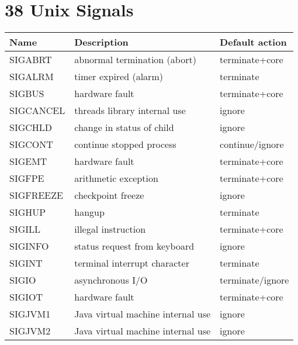 \documentclass{article}
\begin{document}
\section{38 Unix Signals}
\begin{table}[h!]
\begin{center}
    \begin{tabular}[h!]{|l | l | l|}
        \hline
        Name        & Description 	                       & Default action        \\
        \hline
        \hline
        SIGABRT     & abnormal termination (abort)         & terminate+core        \\
        SIGALRM     & timer expired (alarm) 	           & terminate             \\
        SIGBUS 	    & hardware fault 		               & terminate+core        \\
        SIGCANCEL 	& threads library internal use 	       & ignore                \\
        SIGCHLD 	& change in status of child 	       & ignore                \\
        SIGCONT 	& continue stopped process 		       & continue/ignore       \\
        SIGEMT 	    & hardware fault 			           & terminate+core        \\
        SIGFPE 	    & arithmetic exception 	               & terminate+core        \\
        SIGFREEZE   & checkpoint freeze 			       & ignore                \\
        SIGHUP 	    & hangup                               & terminate             \\
        SIGILL 	    & illegal instruction 	               & terminate+core        \\
        SIGINFO 	& status request from keyboard 		   & ignore                \\
        SIGINT 	    & terminal interrupt character 	       & terminate             \\
        SIGIO 	    & asynchronous I/O 			           & terminate/ignore      \\
        SIGIOT 	    & hardware fault 			           & terminate+core        \\
        SIGJVM1 	& Java virtual machine internal use    & ignore                \\
        SIGJVM2 	& Java virtual machine internal use    & ignore                \\

\end{tabular}
\end{center}
\end{table}
\end{document}
